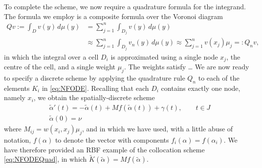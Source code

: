 \documentclass[a4paper]{siamart190516}
\begin{document}
To complete the scheme, we now require a quadrature formula for the integrand. The
formula we employ is a composite formula over the Voronoi diagram
\[
  \begin{aligned}
  Q v := \int_{D} v(y)\,d \mu(y) 
    & = \sum_{j=1}^n \int_{D_j} v(y) \,d \mu(y) \\
    & \approx \sum_{j = 1}^n \int_{D_j} v_n(y) \,d \mu(y)
      \approx \sum_{j = 1}^n v(x_j) \mu_j =: Q_n v,
  \end{aligned}
\]
in which the integral over a cell $D_i$ is approximated using a single node $x_j$,
the centre of the cell, and a single weight $\mu_j$. The weights satisfy \ldots
{} We are now ready to specify a
discrete scheme by applying the quadrature rule $Q_n$ to each of the elements $K_i$ in
\cref{eq:NFODE}. Recalling that each $D_i$ contains exactly one node, namely $x_i$,
we obtain the spatially-discrete scheme
\[
  \begin{aligned}
  & \tilde \alpha'(t) = -\tilde \alpha(t) 
    + M f(\tilde \alpha(t))+ \gamma(t) , \qquad t \in J \\
  & \tilde \alpha(0) = \nu
  \end{aligned}
\]
where $M_{ij} = w(x_i,x_j)\mu_j$, and in which we have used, with a little abuse of
notation, $f(\alpha)$ to denote the vector with components $f_i(\alpha) =
f(\alpha_i)$. We have therefore provided an RBF example of the collocation scheme
\cref{eq:NFODEQuad}, in which $\tilde K(\tilde \alpha) = M f(\tilde \alpha)$.



\end{document}
